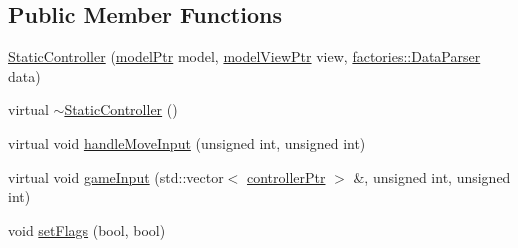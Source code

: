 \subsection*{\-Public \-Member \-Functions}
\begin{DoxyCompactItemize}
\item 
\hyperlink{classcontrollers_1_1StaticController_a9b6918d1ae86fd8cfb5fa7511666dbfb}{\-Static\-Controller} (\hyperlink{ModelView_8h_a78966ddb517fca8d2b29a2bc5c31e74e}{model\-Ptr} model, \hyperlink{Controller_8h_a8ca0a41a38eb52be242997413482c0cf}{model\-View\-Ptr} view, \hyperlink{classfactories_1_1DataParser}{factories\-::\-Data\-Parser} data)
\item 
virtual \hyperlink{classcontrollers_1_1StaticController_a618a514ee9410e37d3f3d10de2fb8fd1}{$\sim$\-Static\-Controller} ()
\item 
virtual void \hyperlink{classcontrollers_1_1StaticController_abcbab9a654ce3797fd07fb18f1ab1e62}{handle\-Move\-Input} (unsigned int, unsigned int)
\item 
virtual void \hyperlink{classcontrollers_1_1StaticController_a0f8fc382d5ba77310050b5686139c89f}{game\-Input} (std\-::vector$<$ \hyperlink{namespacecontrollers_ab74cf2ed38c0b0460698b4eb6fe8bec5}{controller\-Ptr} $>$ \&, unsigned int, unsigned int)
\item 
void \hyperlink{classcontrollers_1_1StaticController_a984d6aca74ea9108462d5906f2853a72}{set\-Flags} (bool, bool)
\end{DoxyCompactItemize}


